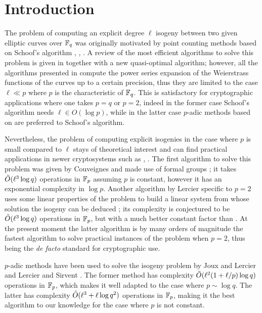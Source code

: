 \section{Introduction}

The problem of computing an explicit degree $\ell$ isogeny between two
given elliptic curves over $\mathbb{F}_q$ was originally motivated by point
counting methods based on Schoof's algorithm \cite{Atk91},
\cite{Elk91}, \cite{Sch95}. A review of the most efficient algorithms
to solve this problem is given in \cite{BoMoSaSc08} together with a
new quasi-optimal algorithm; however, all the algorithms presented in
\cite{BoMoSaSc08} compute the power series expansion of the
Weierstrass functions of the curves up to a certain precision, thus
they are limited to the case $\ell\ll p$ where $p$ is the
characteristic of $\mathbb{F}_q$. This is satisfactory for cryptographic
applications where one takes $p=q$ or $p=2$, indeed in the former case
Schoof's algorithm needs $\ell\in O(\log p)$, while in the latter case
$p$-adic methods based on \cite{Sat00} are preferred to Schoof's
algorithm.

Nevertheless, the problem of computing explicit isogenies in the case
where $p$ is small compared to $\ell$ stays of theoretical interest
and can find practical applications in newer cryptosystems such as
\cite{Tes06}, \cite{RoSt06}. The first algorithm to solve this problem
was given by Couveignes and made use of formal groups \cite{Cou94}; it
takes $\tilde{O}(\ell^3\log q)$ operations in $\mathbb{F}_p$ assuming $p$ is
constant, however it has an exponential complexity in $\log
p$. Another algorithm by Lercier specific to $p=2$ uses some linear
properties of the problem to build a linear system from whose solution
the isogeny can be deduced \cite{Ler96}; its complexity is conjectured
to be $\tilde{O}(\ell^3\log q)$ operations in $\mathbb{F}_p$, but with a much
better constant factor than \cite{Cou94}. At the present moment the
latter algorithm is by many orders of magnitude the fastest algorithm
to solve practical instances of the problem when $p=2$, thus being the
\emph{de facto} standard for cryptographic use.

$p$-adic methods have been used to solve the isogeny problem by Joux
and Lercier \cite{JL06} and Lercier and Sirvent \cite{LeSi09}. The
former method has complexity $\tilde{O}(\ell^2(1 + \ell/p)\log q)$
operations in $\mathbb{F}_p$, which makes it well adapted to the case where
$p\sim\log q$. The latter has complexity $\tilde{O}(\ell^3 + \ell\log
q^2)$ operations in $\mathbb{F}_p$, making it the best algorithm to our
knowledge for the case where $p$ is not constant.

